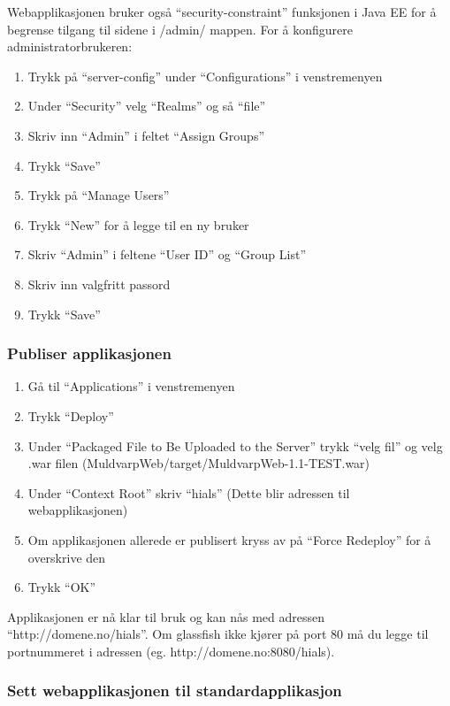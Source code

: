 \documentclass[../main.tex]{subfiles}
\begin{document}
Webapplikasjonen bruker også “security-constraint” funksjonen i Java EE for å begrense tilgang til sidene i /admin/ mappen. \newline
\newline
For å konfigurere administratorbrukeren:
\begin{enumerate}
\item Trykk på “server-config” under “Configurations” i venstremenyen
\item Under “Security” velg “Realms” og så “file”
\item Skriv inn “Admin” i feltet “Assign Groups”
\item Trykk “Save”
\item Trykk på “Manage Users”
\item Trykk “New” for å legge til en ny bruker
\item Skriv “Admin” i feltene “User ID” og “Group List”
\item Skriv inn valgfritt passord
\item Trykk “Save”
\end{enumerate}

\subsubsection{Publiser applikasjonen}
\begin{enumerate}
\item Gå til “Applications” i venstremenyen
\item Trykk “Deploy”
\item Under “Packaged File to Be Uploaded to the Server” trykk “velg fil” og velg .war filen (MuldvarpWeb/target/MuldvarpWeb-1.1-TEST.war)
\item Under “Context Root” skriv “hials” (Dette blir adressen til webapplikasjonen)
\item Om applikasjonen allerede er publisert kryss av på “Force Redeploy” for å overskrive den
\item Trykk “OK”
\end{enumerate}

Applikasjonen er nå klar til bruk og kan nås med adressen “http://domene.no/hials”. Om glassfish ikke kjører på port 80 må du legge til portnummeret i adressen (eg. http://domene.no:8080/hials).

\subsubsection{Sett webapplikasjonen til standardapplikasjon}
\end{document}
